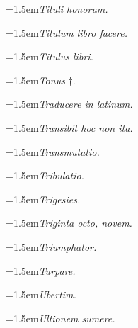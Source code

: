 \par{\dictfontsize\hangindent=1.5em\noindent \textit{Tituli honorum.} \par}
\par{\dictfontsize\hangindent=1.5em\noindent \textit{Titulum libro facere.} \par}
\par{\dictfontsize\hangindent=1.5em\noindent \textit{Titulus libri.} \par}
\par{\dictfontsize\hangindent=1.5em\noindent \textit{Tonus} †. \par}
\par{\dictfontsize\hangindent=1.5em\noindent \textit{Traducere in latinum.} \par}
\par{\dictfontsize\hangindent=1.5em\noindent \textit{Transibit hoc non ita.} \par}
\par{\dictfontsize\hangindent=1.5em\noindent \textit{Transmutatio.} \par}
\par{\dictfontsize\hangindent=1.5em\noindent \textit{Tribulatio.} \par}
\par{\dictfontsize\hangindent=1.5em\noindent \textit{Trigesies.} \par}
\par{\dictfontsize\hangindent=1.5em\noindent \textit{Triginta octo, novem.} \par}
\par{\dictfontsize\hangindent=1.5em\noindent \textit{Triumphator.} \par}
\par{\dictfontsize\hangindent=1.5em\noindent \textit{Turpare.} \par}
\par{\dictfontsize\hangindent=1.5em\noindent \textit{Ubertim.} \par}
\par{\dictfontsize\hangindent=1.5em\noindent \textit{Ultionem sumere.} \par}
